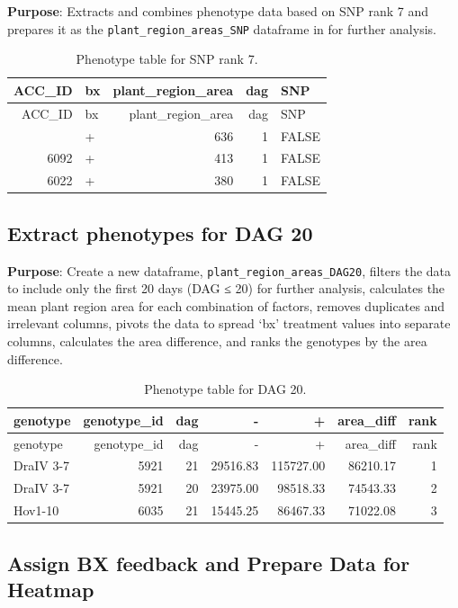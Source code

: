 \documentclass[
  11pt,
]{article}
\begin{document}
\textbf{Purpose}: Extracts and combines phenotype data based on SNP rank
7 and prepares it as the \texttt{plant\_region\_areas\_SNP} dataframe in
for further analysis.

\begin{longtable}[]{@{}rlrrl@{}}
\caption{Phenotype table for SNP rank 7.}\tabularnewline
\toprule\noalign{}
ACC\_ID & bx & plant\_region\_area & dag & SNP \\
\midrule\noalign{}
\endfirsthead
\toprule\noalign{}
ACC\_ID & bx & plant\_region\_area & dag & SNP \\
\midrule\noalign{}
\endhead
\bottomrule\noalign{}
\endlastfoot
9830 & + & 636 & 1 & FALSE \\
6092 & + & 413 & 1 & FALSE \\
6022 & + & 380 & 1 & FALSE \\
\end{longtable}

\subsection{Extract phenotypes for DAG
20}\label{extract-phenotypes-for-dag-20}

\textbf{Purpose}: Create a new dataframe,
\texttt{plant\_region\_areas\_DAG20}, filters the data to include only
the first 20 days (DAG ≤ 20) for further analysis, calculates the mean
plant region area for each combination of factors, removes duplicates
and irrelevant columns, pivots the data to spread `bx' treatment values
into separate columns, calculates the area difference, and ranks the
genotypes by the area difference.

\begin{longtable}[]{@{}lrrrrrr@{}}
\caption{Phenotype table for DAG 20.}\tabularnewline
\toprule\noalign{}
genotype & genotype\_id & dag & - & + & area\_diff & rank \\
\midrule\noalign{}
\endfirsthead
\toprule\noalign{}
genotype & genotype\_id & dag & - & + & area\_diff & rank \\
\midrule\noalign{}
\endhead
\bottomrule\noalign{}
\endlastfoot
DraIV 3-7 & 5921 & 21 & 29516.83 & 115727.00 & 86210.17 & 1 \\
DraIV 3-7 & 5921 & 20 & 23975.00 & 98518.33 & 74543.33 & 2 \\
Hov1-10 & 6035 & 21 & 15445.25 & 86467.33 & 71022.08 & 3 \\
\end{longtable}

\subsection{Assign BX feedback and Prepare Data for
Heatmap}\label{assign-bx-feedback-and-prepare-data-for-heatmap}
\end{document}
